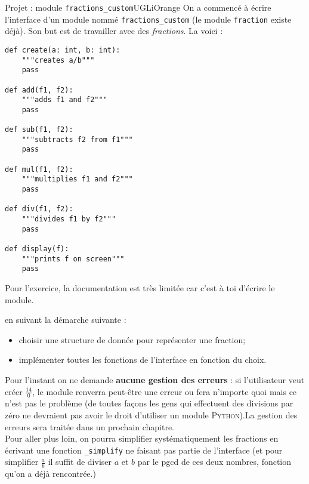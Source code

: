 \documentclass[a4paper,10pt,cours]{nsi}
\begin{document}
\begin{encadrecolore}{Projet : module \texttt{fractions\_custom}}{UGLiOrange}
    On a commencé à écrire l'interface d'un module nommé \texttt{fractions\_custom} (le module \texttt{fraction} existe déjà). Son but est de travailler avec des \textit{fractions}.
    La voici :
    \begin{verbatim}
def create(a: int, b: int):
    """creates a/b"""
    pass

def add(f1, f2):
    """adds f1 and f2"""
    pass

def sub(f1, f2):
    """subtracts f2 from f1"""
    pass

def mul(f1, f2):
    """multiplies f1 and f2"""
    pass

def div(f1, f2):
    """divides f1 by f2"""
    pass

def display(f):
    """prints f on screen"""
    pass
\end{verbatim}
    
    Pour l'exercice, la documentation est très limitée car c'est à toi d'écrire le module.
    
    en suivant la démarche suivante :
    \begin{itemize}
        \item 	choisir une structure de donnée pour représenter une fraction;
        \item 	implémenter toutes les fonctions de l'interface en fonction du choix.
    \end{itemize}
    
    Pour l'instant on ne demande \textbf{aucune gestion des erreurs} : si l'utilisateur veut créer $\frac{14}{0}$, le module renverra peut-être une erreur ou fera n'importe quoi mais ce n'est pas le problème (de toutes façons les gens qui effectuent des divisions par zéro ne devraient pas avoir le droit d'utiliser un module \textsc{Python}).La gestion des erreurs sera traitée dans un prochain chapitre.\\
    
    Pour aller plus loin, on pourra simplifier systématiquement les fractions en écrivant une fonction \texttt{\_simplify} ne faisant pas partie de l'interface (et pour simplifier $\frac{a}{b}$ il suffit de diviser $a$ et $b$ par le pgcd de ces deux nombres, fonction qu'on a déjà rencontrée.)\\
\end{encadrecolore}
\end{document}
